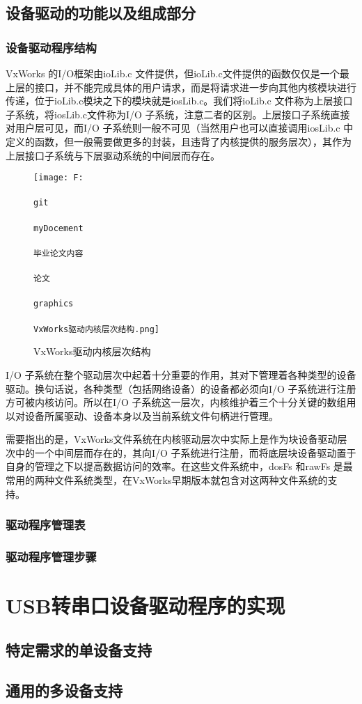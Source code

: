 \subsection{设备驱动的功能以及组成部分}
\subsubsection{设备驱动程序结构}
	VxWorks 的I/O框架由ioLib.c 文件提供，但ioLib.c文件提供的函数仅仅是一个最上层的接口，并不能完成具体的用户请求，而是将请求进一步向其他内核模块进行传递，位于ioLib.c模块之下的模块就是iosLib.c。我们将ioLib.c 文件称为上层接口子系统，将iosLib.c文件称为I/O 子系统，注意二者的区别。上层接口子系统直接对用户层可见，而I/O 子系统则一般不可见（当然用户也可以直接调用iosLib.c 中定义的函数，但一般需要做更多的封装，且违背了内核提供的服务层次），其作为上层接口子系统与下层驱动系统的中间层而存在。
	

	

\begin{figure}[!h]
\centering
\texttt{[image: F:\\\\git\\\\myDocement\\\\毕业论文内容\\\\论文\\\\graphics\\\\VxWorks驱动内核层次结构.png]}
\caption{VxWorks驱动内核层次结构}\label{fig:VxWorks内核驱动层次结构}
\end{figure}

	I/O 子系统在整个驱动层次中起着十分重要的作用，其对下管理着各种类型的设备驱动。换句话说，各种类型（包括网络设备）的设备都必须向I/O 子系统进行注册方可被内核访问。所以在I/O 子系统这一层次，内核维护着三个十分关键的数组用以对设备所属驱动、设备本身以及当前系统文件句柄进行管理。

	需要指出的是，VxWorks文件系统在内核驱动层次中实际上是作为块设备驱动层次中的一个中间层而存在的，其向I/O 子系统进行注册，而将底层块设备驱动置于自身的管理之下以提高数据访问的效率。在这些文件系统中，dosFs 和rawFs 是最常用的两种文件系统类型，在VxWorks早期版本就包含对这两种文件系统的支持。

\subsubsection{驱动程序管理表}
\subsubsection{驱动程序管理步骤}







\section{USB转串口设备驱动程序的实现}

\subsection{特定需求的单设备支持}


\subsection{通用的多设备支持}